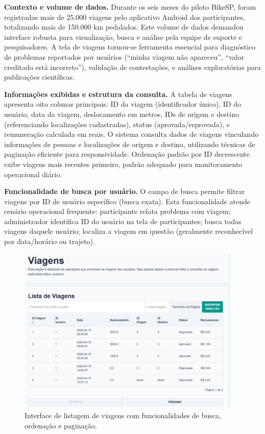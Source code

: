 

\textbf{Contexto e volume de dados.} Durante os seis meses do piloto BikeSP, foram registradas mais de 25.000 viagens pelo aplicativo Android dos participantes, totalizando mais de 150.000 km pedalados. Este volume de dados demandou interface robusta para visualização, busca e análise pela equipe de suporte e pesquisadores. A tela de viagens tornou-se ferramenta essencial para diagnóstico de problemas reportados por usuários (``minha viagem não apareceu'', ``valor creditado está incorreto''), validação de contestações, e análises exploratórias para publicações científicas.

\textbf{Informações exibidas e estrutura da consulta.} A tabela de viagens apresenta oito colunas principais: ID da viagem (identificador único), ID do usuário, data da viagem, deslocamento em metros, IDs de origem e destino (referenciando localizações cadastradas), status (aprovada/reprovada), e remuneração calculada em reais. O sistema consulta dados de viagens vinculando informações de pessoas e localizações de origem e destino, utilizando técnicas de paginação eficiente para responsividade. Ordenação padrão por ID decrescente exibe viagens mais recentes primeiro, padrão adequado para monitoramento operacional diário.

\textbf{Funcionalidade de busca por usuário.} O campo de busca permite filtrar viagens por ID de usuário específico (busca exata). Esta funcionalidade atende cenário operacional frequente: participante relata problema com viagem; administrador identifica ID do usuário na tela de participantes; busca todas viagens daquele usuário; localiza a viagem em questão (geralmente reconhecível por data/horário ou trajeto).

 \begin{figure}[H]
   \centering
   \includegraphics[width=0.95\textwidth]{figuras/viagens_listar.png}
   \caption{Interface de listagem de viagens com funcionalidades de busca, ordenação e paginação.}
   \label{fig:viagens_listar}
 \end{figure}

